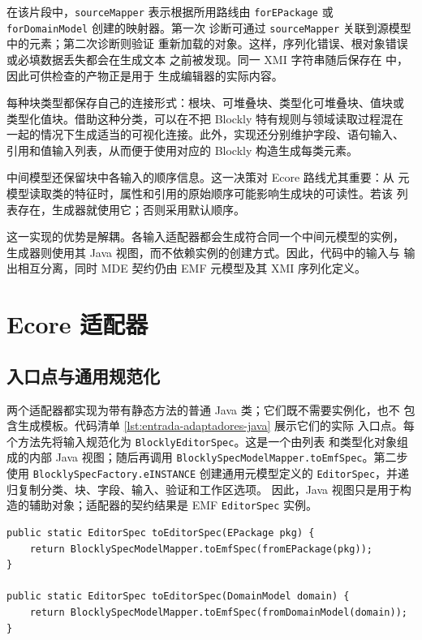 在该片段中，\texttt{sourceMapper} 表示根据所用路线由
\texttt{forEPackage} 或 \texttt{forDomainModel} 创建的映射器。第一次
诊断可通过 \texttt{sourceMapper} 关联到源模型中的元素；第二次诊断则验证
重新加载的对象。这样，序列化错误、根对象错误或必填数据丢失都会在生成文本
之前被发现。同一 XMI 字符串随后保存在
 中，因此可供检查的产物正是用于
生成编辑器的实际内容。

每种块类型都保存自己的连接形式：根块、可堆叠块、类型化可堆叠块、值块或
类型化值块。借助这种分类，可以在不把 Blockly 特有规则与领域读取过程混在
一起的情况下生成适当的可视化连接。此外，实现还分别维护字段、语句输入、
引用和值输入列表，从而便于使用对应的 Blockly 构造生成每类元素。

中间模型还保留块中各输入的顺序信息。这一决策对 Ecore 路线尤其重要：从
元模型读取类的特征时，属性和引用的原始顺序可能影响生成块的可读性。若该
列表存在，生成器就使用它；否则采用默认顺序。

这一实现的优势是解耦。各输入适配器都会生成符合同一个中间元模型的实例，
生成器则使用其 Java 视图，而不依赖实例的创建方式。因此，代码中的输入与
输出相互分离，同时 MDE 契约仍由 EMF 元模型及其 XMI 序列化定义。

\section{Ecore 适配器}
\label{sec:implementacion-ecore-adapter}

\subsection{入口点与通用规范化}

两个适配器都实现为带有静态方法的普通 Java 类；它们既不需要实例化，也不
包含生成模板。代码清单 \ref{lst:entrada-adaptadores-java} 展示它们的实际
入口点。每个方法先将输入规范化为 \texttt{BlocklyEditorSpec}。这是一个由列表
和类型化对象组成的内部 Java 视图；随后再调用
\texttt{BlocklySpecModelMapper.toEmfSpec}。第二步使用
\texttt{BlocklySpecFactory.eINSTANCE} 创建通用元模型定义的
\texttt{EditorSpec}，并递归复制分类、块、字段、输入、验证和工作区选项。
因此，Java 视图只是用于构造的辅助对象；适配器的契约结果是 EMF
\texttt{EditorSpec} 实例。

\begin{lstlisting}[float=htbp, style=tfmjavaecore, caption={两个适配器的 Java 入口点}, label={lst:entrada-adaptadores-java}]
public static EditorSpec toEditorSpec(EPackage pkg) {
    return BlocklySpecModelMapper.toEmfSpec(fromEPackage(pkg));
}

public static EditorSpec toEditorSpec(DomainModel domain) {
    return BlocklySpecModelMapper.toEmfSpec(fromDomainModel(domain));
}
\end{lstlisting}

